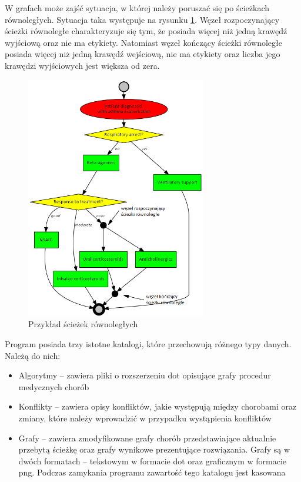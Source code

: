 W grafach może zajść sytuacja, w której należy poruszać się po ścieżkach równoległych. Sytuacja taka występuje na rysunku \ref{fig:sciezki_rownolegle}. Węzeł rozpoczynający ścieżki równoległe charakteryzuje się tym, że posiada więcej niż jedną krawędź wyjściową oraz nie ma etykiety. Natomiast węzeł kończący ścieżki równoległe posiada więcej niż jedną krawędź wejściową, nie ma etykiety oraz liczba jego krawędzi wyjściowych jest większa od zera.
\begin{figure}[H]
\centering
\includegraphics[width=0.7\textwidth]{img/asthma_sciezki_rownolegle.png}
\caption{Przykład ścieżek równoległych}
\label{fig:sciezki_rownolegle}
\end{figure}

Program posiada trzy istotne katalogi, które przechowują różnego typy danych. Należą do nich:
\begin{itemize}
\item{Algorytmy – zawiera pliki o rozszerzeniu dot opisujące grafy procedur medycznych chorób}
\item{Konflikty – zawiera opisy konfliktów, jakie występują między chorobami oraz zmiany, które należy wprowadzić w przypadku wystąpienia konfliktów}
\item{Grafy – zawiera zmodyfikowane grafy chorób przedstawiające aktualnie przebytą ścieżkę oraz grafy wynikowe prezentujące rozwiązania. Grafy są w dwóch formatach – tekstowym w formacie dot oraz graficznym w formacie png. Podczas zamykania programu zawartość tego katalogu jest kasowana}
\end{itemize}


